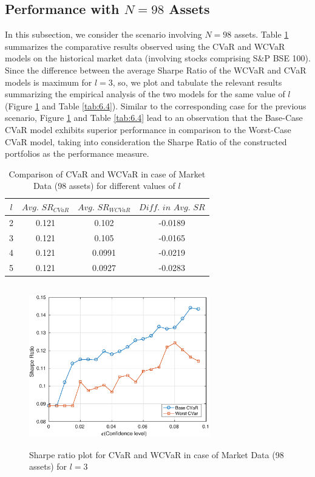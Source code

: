 \subsection{Performance with $N=98$ Assets}

In this subsection, we consider the scenario involving $N=98$ assets. Table \ref{avgtab:6.4} summarizes the comparative results observed using the CVaR and WCVaR models on the historical market data (involving stocks comprising S\&P BSE 100). Since the difference between the average Sharpe Ratio of the WCVaR and CVaR models is maximum for $l=3$, so, we plot and tabulate the relevant results summarizing the empirical analysis of the two models for the same value of $l$ (Figure \ref{fig:6.4} and Table \ref{tab:6.4}). Similar to the corresponding case for the previous scenario, Figure \ref{fig:6.4} and Table \ref{tab:6.4} lead to an observation that the Base-Case CVaR model exhibits superior performance in comparison to the Worst-Case CVaR model, taking into consideration the Sharpe Ratio of the constructed portfolios as the performance measure. 

\begin{table}[!h]
    \centering
    \captionsetup{justification=centering}

   \begin{tabular}{||c|c|c|c||}
   \hline
  
$l$ & $Avg. \, \, SR_{CVaR}$ & $Avg. \, \, SR_{WCVaR}$ & $Diff. \, \, in \, \, Avg. \, \, SR$ \\
  
  \hline
2 & 0.121 & 0.102 & -0.0189 \\
3 & 0.121 & 0.105 & -0.0165 \\
4 & 0.121 & 0.0991 & -0.0219 \\
5 & 0.121 & 0.0927 & -0.0283 \\
  \hline
\end{tabular}
    \caption{Comparison of CVaR and WCVaR in case of Market Data (98 assets) for different values of $l$}
    \label{avgtab:6.4}
\end{table}

\begin{figure}[!h]
    \centering
   
    \includegraphics[height=7.0cm,width=0.7\textwidth]{CVaR/bse100_market/sr_cvar_3.eps}

   \caption{Sharpe ratio plot for CVaR and WCVaR in case of Market Data (98 assets) for $l=3$}
   \label{fig:6.4}
\end{figure}


